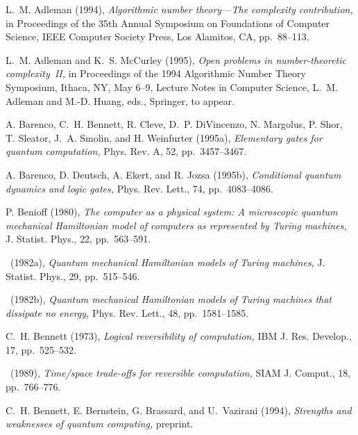 {
\begin{thebibliography}{}

  {\sc L.~M. Adleman} (1994), {\em Algorithmic 
number theory---The complexity contribution,} in {Proceedings of the
35th Annual Symposium on Foundations of Computer Science,}   
IEEE Computer Society Press, Los Alamitos, CA, pp.~88--113.

  {\sc L.~M. Adleman and 
K.~S. McCurley} (1995), {\em Open problems in number-theoretic 
complexity~{\rm II,}} in {Proceedings of the 1994 Algorithmic Number 
Theory Symposium,} Ithaca, NY, May 6--9, Lecture Notes in Computer Science, 
L.~M. Adleman and M.-D. Huang, eds., Springer, to appear.

{\sc A. Barenco, C.~H. Bennett, R. Cleve, D.~P. DiVincenzo, N. Margolus,
P. Shor, T. Sleator, J.~A. Smolin, and H. Weinfurter} (1995a), {\em 
Elementary gates for quantum computation,} {Phys. Rev. A,} 52, 
pp.~3457--3467.

  {\sc A. Barenco, D. Deutsch, 
A. Ekert, and R. Jozsa} (1995b), {\em Conditional quantum dynamics and logic 
gates,} {Phys. Rev. Lett.,} {74,} pp.~4083--4086.

  {\sc P. Benioff} (1980), {\em The computer as
a physical system{\rm :} A microscopic quantum mechanical 
Hamiltonian model of computers as represented by Turing machines,}
{J. Statist. Phys.,} {22,} pp.~563--591.

  \sameauthor\  (1982a), {\em Quantum 
mechanical Hamiltonian models of Turing machines,}
{J. Statist. Phys.,} {29,} pp.~515--546.

  \sameauthor\  (1982b), {\em Quantum 
mechanical Hamiltonian models of Turing machines that dissipate no energy,}
{Phys. Rev. Lett.,} {48,} pp.~1581--1585.

  {\sc C.~H. Bennett} (1973), {\em Logical 
reversibility of computation,} {IBM J. Res. Develop.,} {17,} pp.~525--532.

  \sameauthor\  (1989), {\em Time{/}space
trade-offs for reversible computation,} {SIAM J. Comput.,}
{18,} pp.~766--776.

  {\sc C.~H. Bennett, 
E. Bernstein, G. Brassard, and U.~Vazirani} (1994), {\em Strengths 
and weaknesses of quantum computing,} preprint.


\end{thebibliography}}
